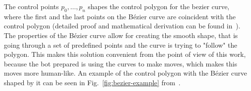 The control points $p_0,\dots,p_n$ shapes the control polygon for the bezier curve, where the first and the last points on the Bézier curve are coincident with the control polygon (detailed proof and mathematical derivation can be found in~\cite{farouki2012bernstein}).
The properties of the Bézier curve allow for creating the smooth shape, that is going through a set of predefined points and the curve is trying to "follow" the polygon.
This makes this solution convenient from the point of view of this work, because the bot prepared is using the curves to make moves, which makes this moves more human-like.
An example of the control polygon with the Bézier curve shaped by it can be seen in Fig.~\ref{fig:bezier-example} from~\cite{farouki2012bernstein}.
